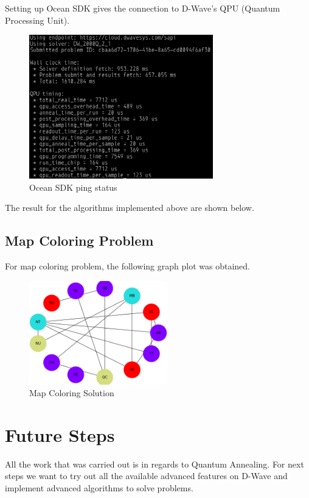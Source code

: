 \documentclass[12pt,conference]{IEEEtran}
\begin{document}
Setting up Ocean SDK gives the connection to D-Wave's QPU (Quantum Processing Unit).

\begin{figure}[h]
  \centering
  \includegraphics[width=8cm]{sdk.png}
  \caption{Ocean SDK ping status}
  \label{fig:OSDK}
\end{figure}


The result for the algorithms implemented above are shown below. 

\subsection{Map Coloring Problem}

For map coloring problem, the following graph plot was obtained.
\begin{figure}[h]
  \centering
  \includegraphics[width=6cm]{map_coloring.png}
  \caption{Map Coloring Solution}
  \label{fig:MCS}
\end{figure}


\section{Future Steps}
All the work that was carried out is in regards to Quantum Annealing. For next steps we want to try out all the available advanced features on D-Wave and implement advanced algorithms to solve problems. 
\end{document}
